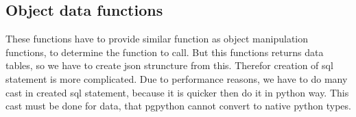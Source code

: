 \documentclass[deska]{subfiles}
\begin{document}
\subsection{Object data functions}
These functions have to provide similar function as object manipulation functions, to determine the function to call. But this functions returns data tables, so we have to create json struncture from this. Therefor creation of sql statement is more complicated. Due to performance reasons, we have to do many cast in created sql statement, because it is quicker then do it in python way. This cast must be done for data, that pgpython cannot convert to native python types.
\end{document}
